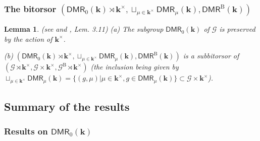 \documentclass[10pt]{amsart}
\newtheorem{lem}[thm]{Lemma}
\numberwithin{equation}{subsection}
\begin{document}
\subsubsection{The bitorsor $(\mathsf{DMR}_0(\mathbf k)\rtimes\mathbf k^\times,
\sqcup_{\mu\in\mathbf k^\times}\mathsf{DMR}_\mu(\mathbf k),
\mathsf{DMR}^{\mathrm B}(\mathbf k))$}

\begin{lem}\label{lem:15:5} (see \cite{R} and \cite{EF3}, Lem. 3.11)
(a) The subgroup $\mathsf{DMR}_0(\mathbf k)$ of $\mathcal G$ is preserved by the 
action of $\mathbf k^\times$. 

(b) $(\mathsf{DMR}_0(\mathbf k)\rtimes\mathbf k^\times,
\sqcup_{\mu\in\mathbf k^\times}\mathsf{DMR}_\mu(\mathbf k),
  \mathsf{DMR}^{\mathrm B}(\mathbf k))$ is a subbitorsor of  
  $(\mathcal G\rtimes\mathbf k^\times,\mathcal G\times\mathbf k^\times,
\mathcal G^{\mathrm B}\rtimes\mathbf k^\times)$
(the inclusion being given by $\sqcup_{\mu\in\mathbf k^\times}\mathsf{DMR}_\mu(\mathbf k)
=\{(g,\mu)|\mu\in\mathbf k^\times,g\in \mathsf{DMR}_\mu(\mathbf k)\}
\subset \mathcal G\times\mathbf k^\times$).  
\end{lem}



\subsection{Summary of the results}\label{subsect:summary}


\subsubsection{Results on $\mathsf{DMR}_0(\mathbf k)$}

\end{document}

